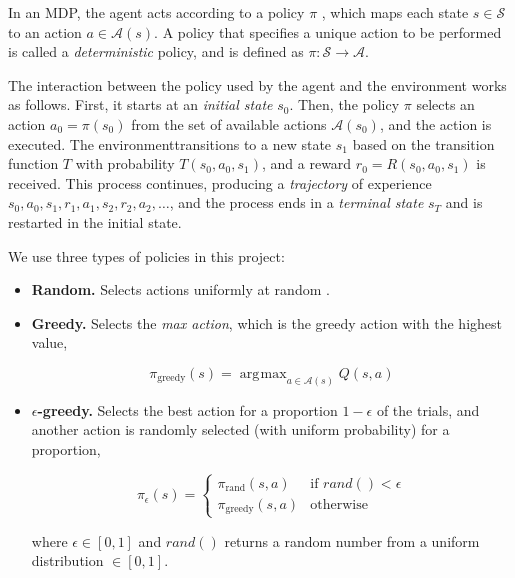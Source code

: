 \documentclass[a4paper]{article}
\DeclareMathOperator*{\argmax}{\arg\!\max}
\begin{document}
In an MDP, the agent acts according to a policy $\pi$ , which maps each state $s \in \mathcal{S}$ to an action $a \in \mathcal{A}(s)$. A policy that specifies a unique action to be performed is called a \emph{deterministic} policy, and is defined as $\pi : \mathcal{S}
\rightarrow \mathcal{A}$.

The interaction between the policy used by the agent and the environment works as follows. First, it starts at an \emph{initial state} $s_0$. Then, the policy $\pi$ selects an action $a_0 = \pi(s_0)$ from the set of available actions $\mathcal{A}(s_0)$, and the action is executed. The environmenttransitions to a new state $s_1$ based on the transition function $T$ with probability $T(s_0,a_0,s_1)$, and a reward $r_0 = R(s_0, a_0, s_1)$ is received. This process continues, producing a \emph{trajectory} of experience $s_0, a_0, s_1, r_1, a_1, s_2, r_2, a_2, \dots$, and the process ends in a \emph{terminal state} $s_T$ and is restarted in the initial state.

We use three types of policies in this project:

\begin{itemize}

    \item \textbf{Random.} Selects actions uniformly at random
       .

    \item \textbf{Greedy.} Selects the \emph{max action}, which is the greedy
                           action with the highest value,

        \begin{equation}
            \pi_{\textrm{greedy}}(s) = \argmax_{a \in \mathcal{A}(s)} Q(s, a)
        \end{equation}

    \item \textbf{$\epsilon$-greedy.} Selects the best action for a proportion
        $1 - \epsilon$ of the trials, and another action is randomly selected (with
        uniform probability) for a proportion,

        \begin{equation}
            \pi_{\epsilon}(s) = \left\{
             \begin{array}{lr}
                 \pi_{\textrm{rand}}(s,a) & \text{if } rand() < \epsilon\\
                 \pi_{\textrm{greedy}}(s,a) & \text{otherwise}
             \end{array}
           \right.
        \end{equation}

        where $\epsilon \in [0, 1]$ and $rand()$ returns a random number from a
        uniform distribution $\in [0, 1]$.

\end{itemize}
\end{document}
